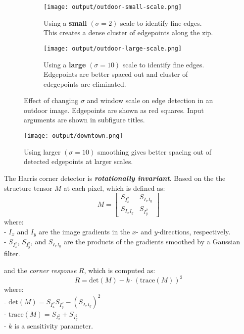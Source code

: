 \documentclass[12pt]{report}
\begin{document}
\begin{enumerate}
    \begin{figure}[!ht]\centering
        \hspace*{-0.8in}
        \begin{subfigure}{0.45\textwidth}
            \texttt{[image: output/outdoor-small-scale.png]}
            \caption{Using a \textbf{small} $(\sigma=2)$ scale to identify fine edges. This creates a dense cluster of edgepoints along the zip.}
            \label{fig:Figure23a}
        \end{subfigure}
    \hfil
        \begin{subfigure}{0.45\textwidth}
        \texttt{[image: output/outdoor-large-scale.png]}
        \caption{Using a \textbf{large} $(\sigma=10)$ scale to identify fine edges. Edgepoints are better spaced out and cluster of edegepoints are eliminated.}
        \label{fig:Figure23b}
        \end{subfigure}
        \caption{Effect of changing $\sigma$ and window scale on edge detection in an outdoor image. Edgepoints are shown as red squares. Input arguments are shown in 
        subfigure titles.}
        \label{fig:Figure23}
    \end{figure}

    \begin{figure}[H]
        \centering
        \texttt{[image: output/downtown.png]}
        \caption{Using larger $(\sigma=10)$ smoothing gives better spacing out of detected edgepoints at larger scales.}
        \label{fig:Figure24}
    \end{figure}

    The Harris corner detector is \textit{\textbf{rotationally invariant}}. Based on the the structure tensor \( M \) at each pixel, which is defined as:
    \[
    M = \begin{bmatrix}
    S_{I_x^2} & S_{I_x I_y} \\
    S_{I_x I_y} & S_{I_y^2}
    \end{bmatrix}
    \]
    where:\\
    - \( I_x \) and \( I_y \) are the image gradients in the \( x \)- and \( y \)-directions, respectively. \\
    - \( S_{I_x^2} \), \( S_{I_y^2} \), and \( S_{I_x I_y} \) are the products of the gradients smoothed by a Gaussian filter.  

    and the \textit{corner response} \( R \), which is computed as:
    \[
    R = \text{det}(M) - k \cdot (\text{trace}(M))^2
    \]
    where: \\
    - \( \text{det}(M) = S_{I_x^2} S_{I_y^2} - (S_{I_x I_y})^2 \) \\
    - \( \text{trace}(M) = S_{I_x^2} + S_{I_y^2} \) \\
    - \( k \) is a sensitivity parameter.  
    

\end{enumerate}
\end{document}
